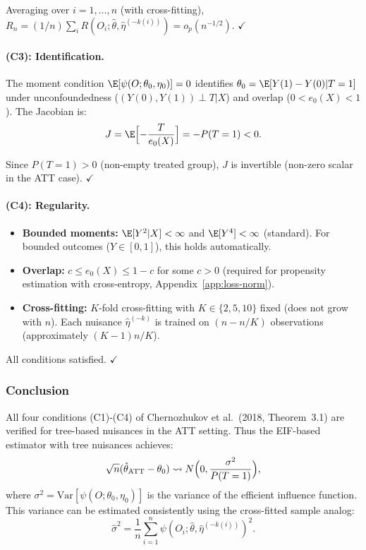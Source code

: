 Averaging over $i = 1, \ldots, n$ (with cross-fitting), $R_n = (1/n)\sum_i R(O_i; \hat\theta, \hat\eta^{(-k(i))}) = o_p(n^{-1/2})$. $\checkmark$

\paragraph{(C3): Identification.}
The moment condition $\E[\psi(O; \theta_0, \eta_0)] = 0$ identifies $\theta_0 = \E[Y(1) - Y(0) | T = 1]$ under unconfoundedness ($(Y(0), Y(1)) \perp T | X$) and overlap ($0 < e_0(X) < 1$). The Jacobian is:
\[
J = \E\Bigl[ -\frac{T}{e_0(X)} \Bigr] = -P(T = 1) < 0.
\]

Since $P(T = 1) > 0$ (non-empty treated group), $J$ is invertible (non-zero scalar in the ATT case). $\checkmark$

\paragraph{(C4): Regularity.}
\begin{itemize}
\item \textbf{Bounded moments:} $\E[Y^2 | X] < \infty$ and $\E[Y^4] < \infty$ (standard). For bounded outcomes ($Y \in [0,1]$), this holds automatically.
\item \textbf{Overlap:} $c \le e_0(X) \le 1-c$ for some $c > 0$ (required for propensity estimation with cross-entropy, Appendix~\ref{app:loss-norm}).
\item \textbf{Cross-fitting:} $K$-fold cross-fitting with $K \in \{2, 5, 10\}$ fixed (does not grow with $n$). Each nuisance $\hat\eta^{(-k)}$ is trained on $(n - n/K)$ observations (approximately $(K-1)n/K$).
\end{itemize}

All conditions satisfied. $\checkmark$

\subsubsection{Conclusion}

All four conditions (C1)-(C4) of Chernozhukov et al.\ (2018, Theorem~3.1) are verified for tree-based nuisances in the ATT setting. Thus the EIF-based estimator with tree nuisances achieves:
\[
\sqrt{n}(\hat\theta_{\text{ATT}} - \theta_0) \leadsto N\Bigl(0, \frac{\sigma^2}{P(T=1)}\Bigr),
\]
where $\sigma^2 = \text{Var}[\psi(O; \theta_0, \eta_0)]$ is the variance of the efficient influence function. This variance can be estimated consistently using the cross-fitted sample analog:
\[
\hat\sigma^2 = \frac{1}{n} \sum_{i=1}^n \psi(O_i; \hat\theta, \hat\eta^{(-k(i))})^2.
\]
